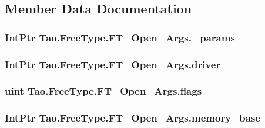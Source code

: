 \subsection{Member Data Documentation}
\hypertarget{struct_tao_1_1_free_type_1_1_f_t___open___args_a4dd8817cbe072ecc2eee30762fa72870}{
\subsubsection[{\_\-params}]{\setlength{\rightskip}{0pt plus 5cm}IntPtr {\bf Tao.FreeType.FT\_\-Open\_\-Args.\_\-params}}}
\label{struct_tao_1_1_free_type_1_1_f_t___open___args_a4dd8817cbe072ecc2eee30762fa72870}
\hypertarget{struct_tao_1_1_free_type_1_1_f_t___open___args_a78291b00524de7112b5ac41eb92a214b}{
\subsubsection[{driver}]{\setlength{\rightskip}{0pt plus 5cm}IntPtr {\bf Tao.FreeType.FT\_\-Open\_\-Args.driver}}}
\label{struct_tao_1_1_free_type_1_1_f_t___open___args_a78291b00524de7112b5ac41eb92a214b}
\hypertarget{struct_tao_1_1_free_type_1_1_f_t___open___args_a117a76e42bf77d65e0d733342c4d28f1}{
\subsubsection[{flags}]{\setlength{\rightskip}{0pt plus 5cm}uint {\bf Tao.FreeType.FT\_\-Open\_\-Args.flags}}}
\label{struct_tao_1_1_free_type_1_1_f_t___open___args_a117a76e42bf77d65e0d733342c4d28f1}
\hypertarget{struct_tao_1_1_free_type_1_1_f_t___open___args_aafdbf467b031c162f7a0a8fd4f031f66}{
\subsubsection[{memory\_\-base}]{\setlength{\rightskip}{0pt plus 5cm}IntPtr {\bf Tao.FreeType.FT\_\-Open\_\-Args.memory\_\-base}}}
